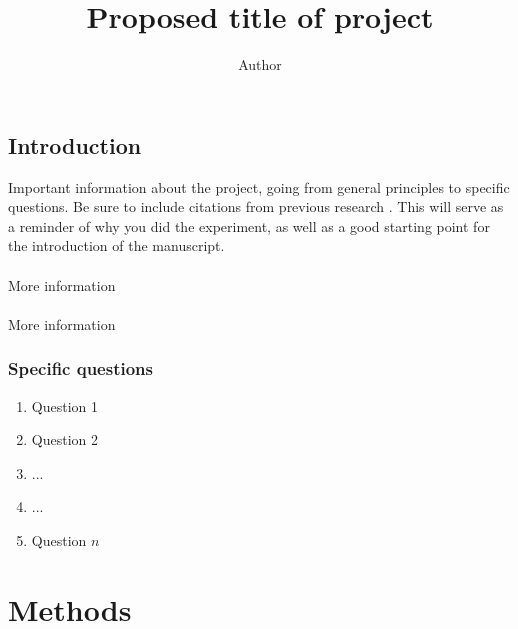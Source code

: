 \documentclass[a4paper,11pt]{article}
\author{Author}
\title{Proposed title of project}
\date{}
\begin{document}
\setcounter{page}{1}
\maketitle







\subsection*{Introduction}

Important information about the project, going from general principles to specific questions. Be sure to include citations from previous research \citep{dallas2019}. This will serve as a reminder of why you did the experiment, as well as a good starting point for the introduction of the manuscript. 





\paragraph*{}
More information



\paragraph*{}
More information









\subsubsection*{Specific questions}

\begin{enumerate}
  \item Question 1
  \item Question 2
  \item ...
  \item ...
  \item Question $n$
\end{enumerate}











\section*{Methods}
\end{document}
